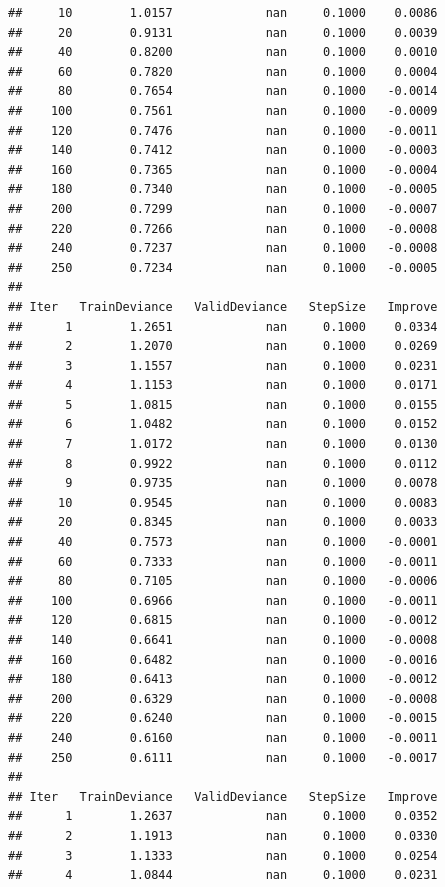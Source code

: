 \documentclass[]{book}
\begin{document}
\begin{verbatim}
##     10        1.0157             nan     0.1000    0.0086
##     20        0.9131             nan     0.1000    0.0039
##     40        0.8200             nan     0.1000    0.0010
##     60        0.7820             nan     0.1000    0.0004
##     80        0.7654             nan     0.1000   -0.0014
##    100        0.7561             nan     0.1000   -0.0009
##    120        0.7476             nan     0.1000   -0.0011
##    140        0.7412             nan     0.1000   -0.0003
##    160        0.7365             nan     0.1000   -0.0004
##    180        0.7340             nan     0.1000   -0.0005
##    200        0.7299             nan     0.1000   -0.0007
##    220        0.7266             nan     0.1000   -0.0008
##    240        0.7237             nan     0.1000   -0.0008
##    250        0.7234             nan     0.1000   -0.0005
## 
## Iter   TrainDeviance   ValidDeviance   StepSize   Improve
##      1        1.2651             nan     0.1000    0.0334
##      2        1.2070             nan     0.1000    0.0269
##      3        1.1557             nan     0.1000    0.0231
##      4        1.1153             nan     0.1000    0.0171
##      5        1.0815             nan     0.1000    0.0155
##      6        1.0482             nan     0.1000    0.0152
##      7        1.0172             nan     0.1000    0.0130
##      8        0.9922             nan     0.1000    0.0112
##      9        0.9735             nan     0.1000    0.0078
##     10        0.9545             nan     0.1000    0.0083
##     20        0.8345             nan     0.1000    0.0033
##     40        0.7573             nan     0.1000   -0.0001
##     60        0.7333             nan     0.1000   -0.0011
##     80        0.7105             nan     0.1000   -0.0006
##    100        0.6966             nan     0.1000   -0.0011
##    120        0.6815             nan     0.1000   -0.0012
##    140        0.6641             nan     0.1000   -0.0008
##    160        0.6482             nan     0.1000   -0.0016
##    180        0.6413             nan     0.1000   -0.0012
##    200        0.6329             nan     0.1000   -0.0008
##    220        0.6240             nan     0.1000   -0.0015
##    240        0.6160             nan     0.1000   -0.0011
##    250        0.6111             nan     0.1000   -0.0017
## 
## Iter   TrainDeviance   ValidDeviance   StepSize   Improve
##      1        1.2637             nan     0.1000    0.0352
##      2        1.1913             nan     0.1000    0.0330
##      3        1.1333             nan     0.1000    0.0254
##      4        1.0844             nan     0.1000    0.0231

\end{verbatim}
\end{document}
